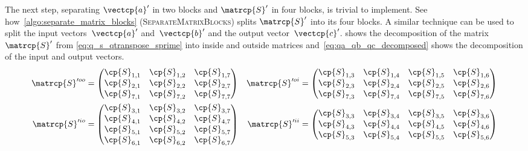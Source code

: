 \begin{refsection}
The next step, separating $\vectcp{a}'$ in two blocks and $\matrcp{S}'$ in four blocks, is trivial to implement.
See how~\cref{algo:separate_matrix_blocks}
(\textsc{SeparateMatrixBlocks}) splits $\matrcp{S}'$ into its four blocks.
A similar technique can be used to split
the input vectors~$\vectcp{a}'$ and~$\vectcp{b}'$ and
the output vector~$\vectcp{c}'$.
 shows the decomposition
of the matrix $\matrcp{S}'$ from \cref{eq:q_s_qtranspose_sprime}
into inside and outside matrices
and~\cref{eq:qa_qb_qc_decomposed} shows the decomposition of
the input and output vectors.
\begin{equation}
    \begin{aligned}
    \matrcp{S}'^{oo}
    &=
    \begin{pmatrix}
        \cp{S}_{1,1} & \cp{S}_{1,2} & \cp{S}_{1,7} \\
        \cp{S}_{2,1} & \cp{S}_{2,2} & \cp{S}_{2,7} \\
        \cp{S}_{7,1} & \cp{S}_{7,2} & \cp{S}_{7,7} \\
    \end{pmatrix}
    &
    \matrcp{S}'^{oi}
    &=
    \begin{pmatrix}
        \cp{S}_{1,3} & \cp{S}_{1,4} & \cp{S}_{1,5} & \cp{S}_{1,6} \\
        \cp{S}_{2,3} & \cp{S}_{2,4} & \cp{S}_{2,5} & \cp{S}_{2,6} \\
        \cp{S}_{7,3} & \cp{S}_{7,4} & \cp{S}_{7,5} & \cp{S}_{7,6} \\
    \end{pmatrix}
    \\
    \matrcp{S}'^{io}
    &=
    \begin{pmatrix}
        \cp{S}_{3,1} & \cp{S}_{3,2} & \cp{S}_{3,7} \\
        \cp{S}_{4,1} & \cp{S}_{4,2} & \cp{S}_{4,7} \\
        \cp{S}_{5,1} & \cp{S}_{5,2} & \cp{S}_{5,7} \\
        \cp{S}_{6,1} & \cp{S}_{6,2} & \cp{S}_{6,7} \\
    \end{pmatrix}
    &
    \matrcp{S}'^{ii}
    &=
    \begin{pmatrix}
        \cp{S}_{3,3} & \cp{S}_{3,4} & \cp{S}_{3,5} & \cp{S}_{3,6} \\
        \cp{S}_{4,3} & \cp{S}_{4,4} & \cp{S}_{4,5} & \cp{S}_{4,6} \\
        \cp{S}_{5,3} & \cp{S}_{5,4} & \cp{S}_{5,5} & \cp{S}_{5,6} \\

\end{pmatrix}
\end{aligned}
\end{equation}
\end{refsection}
